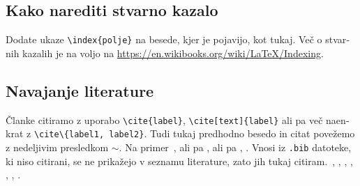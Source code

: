 \documentclass[12pt,a4paper,twoside]{article}
\newcommand{\literatura}{literatura}  %
\theoremstyle{definition} %
\theoremstyle{plain} %
\numberwithin{equation}{section}  %
\begin{document}
\begin{otherlanguage}{slovene}
\subsection{Kako narediti stvarno kazalo}
Dodate ukaze \verb|\index{polje}| na besede, kjer je pojavijo, kot tukaj.
Več o stvarnih kazalih je na voljo na \url{https://en.wikibooks.org/wiki/LaTeX/Indexing}.

\subsection{Navajanje literature}
Članke citiramo z uporabo \verb|\cite{label}|, \verb|\cite[text]{label}| ali pa več naenkrat z
\verb|\cite\{label1, label2}|. Tudi tukaj predhodno besedo in citat povežemo z nedeljivim presledkom
$\sim$. Na primer~\cite{chen2006meshless,liu2001point}, ali pa \cite{kibriya2007empirical}, ali pa
\cite[str.\ 12]{trobec2015parallel}, \cite[enačba (2.3)]{pereira2016convergence}.
Vnosi iz \verb|.bib| datoteke, ki niso citirani, se ne prikažejo v seznamu literature, zato jih
tukaj citiram.~\cite{vene2000categorical}, \cite{gregoric2017stopniceni}, \cite{slak2015induktivni},
\cite{nsphere}, \cite{kearsley1975linearly}, \cite{STtemplate}, \cite{NunbergerTand}.

\end{otherlanguage}

\cleardoublepage                           %

\printindex
\end{document}

